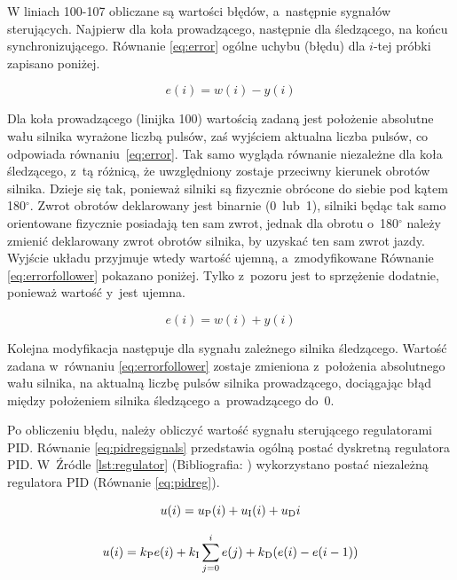 W liniach 100-107 obliczane są wartości błędów, a~następnie sygnałów sterujących. Najpierw dla koła prowadzącego, następnie dla śledzącego, na końcu synchronizującego. Równanie \ref{eq:error} ogólne uchybu (błędu) dla $i$-tej próbki zapisano poniżej.

\begin{equation}\label{eq:error}
  e(i)=w(i)-y(i)
\end{equation}

Dla koła prowadzącego (linijka 100) wartością zadaną jest położenie absolutne wału silnika wyrażone liczbą pulsów, zaś wyjściem aktualna liczba pulsów, co odpowiada równaniu~\ref{eq:error}. Tak samo wygląda równanie niezależne dla koła śledzącego, z~tą różnicą, że uwzględniony zostaje przeciwny kierunek obrotów silnika. Dzieje się tak, ponieważ silniki są fizycznie obrócone do siebie pod kątem 180$^{\circ}$. Zwrot obrotów deklarowany jest binarnie (0~lub~1), silniki będąc tak samo orientowane fizycznie posiadają ten sam zwrot, jednak dla obrotu o~180$^{\circ}$ należy zmienić deklarowany zwrot obrotów silnika, by uzyskać ten sam zwrot jazdy. Wyjście układu przyjmuje wtedy wartość ujemną, a~zmodyfikowane Równanie \ref{eq:errorfollower} pokazano poniżej. Tylko z~pozoru jest to sprzężenie dodatnie, ponieważ wartość y~jest ujemna.

\begin{equation}\label{eq:errorfollower}
  e(i)=w(i)+y(i)
\end{equation}

Kolejna modyfikacja następuje dla sygnału zależnego silnika śledzącego. Wartość zadana w~równaniu \ref{eq:errorfollower} zostaje zmieniona z~położenia absolutnego wału silnika, na aktualną liczbę pulsów silnika prowadzącego, dociągając błąd między położeniem silnika śledzącego a~prowadzącego do~0.

Po obliczeniu błędu, należy obliczyć wartość sygnału sterującego regulatorami PID. Równanie \ref{eq:pidregsignals} przedstawia ogólną postać dyskretną regulatora PID. W~Źródle \ref{lst:regulator} (Bibliografia: \cite{bib:espidfcomponents}\cite{bib:instrukcjalabyuapid}) wykorzystano postać niezależną regulatora PID (Równanie \ref{eq:pidreg}).

\begin{equation}\label{eq:pidregsignals}
  u(i)=u\textsubscript{P}(i)+u\textsubscript{I}(i)+u\textsubscript{D}i
\end{equation}

\begin{equation}\label{eq:pidreg}
  u(i)=k\textsubscript{P}e(i)+k\textsubscript{I}\sum_{j=0}^{i}e(j)+k\textsubscript{D}(e(i)-e(i-1))
\end{equation}

